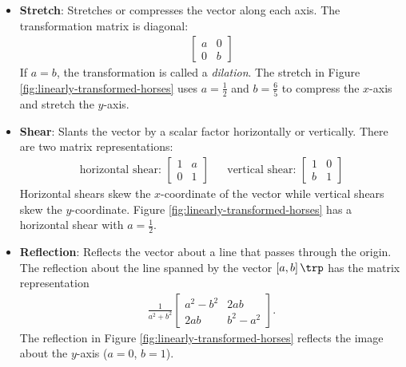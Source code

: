 \begin{itemize}

\item \textbf{Stretch}: %
Stretches or compresses the vector along each axis.
The transformation matrix is diagonal:
%
\begin{align*}
\left[\begin{array}{rr}
a & 0  \\
0 & b
\end{array}\right]
\end{align*}
%
If $a=b$, the transformation is called a \emph{dilation}.
The stretch in Figure \ref{fig:linearly-transformed-horses} uses $a = \frac{1}{2}$ and $b = \frac{6}{5}$ to compress the $x$-axis and stretch the $y$-axis.

\item \textbf{Shear}: %
Slants the vector by a scalar factor horizontally or vertically.
There are two matrix representations:
%
\begin{align*}
\text{horizontal shear:\ }
\left[\begin{array}{cc}
1 & a\\
0 & 1
\end{array}\right]
&&
\text{vertical shear:\ }
\left[\begin{array}{cc}
1 & 0\\
b & 1
\end{array}\right]
\end{align*}
%
Horizontal shears skew the $x$-coordinate of the vector while vertical shears skew the $y$-coordinate.
Figure \ref{fig:linearly-transformed-horses} has a horizontal shear with $a=\frac{1}{2}$.

\item \textbf{Reflection}: Reflects the vector about a line that passes through the origin.
The reflection about the line spanned by the vector $\left[a, b\right]\trp$ has the matrix representation
%
\begin{align*}
\frac{1}{a^2 + b^2}
\left[\begin{array}{cc}
a^2 - b^2 & 2ab \\
2ab       & b^2 - a^2
\end{array}\right].
\end{align*}
%
The reflection in Figure \ref{fig:linearly-transformed-horses} reflects the image about the $y$-axis ($a=0$, $b=1$).


\end{itemize}
